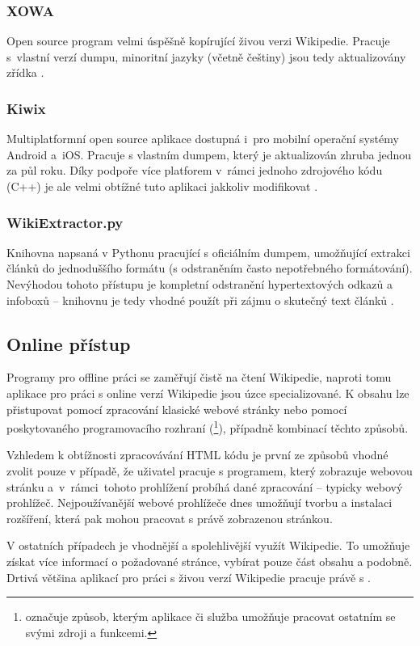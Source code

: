 \subsubsection{XOWA}
Open source program velmi úspěšně kopírující živou verzi Wikipedie. Pracuje s~vlastní verzí dumpu, minoritní jazyky (včetně češtiny) jsou tedy aktualizovány zřídka \cite{xowa}.
\subsubsection{Kiwix}
Multiplatformní open source aplikace dostupná i~pro mobilní operační systémy Android a~iOS. Pracuje s vlastním dumpem, který je aktualizován zhruba jednou za půl roku. Díky podpoře více platforem v~rámci jednoho zdrojového kódu (C++) je ale velmi obtížné tuto aplikaci jakkoliv modifikovat \cite{kiwix}.
\subsubsection{WikiExtractor.py}
Knihovna napsaná v Pythonu pracující s oficiálním dumpem, umožňující extrakci článků do jednoduššího formátu (s odstraněním často nepotřebného formátování). Nevýhodou tohoto přístupu je kompletní odstranění hypertextových odkazů a infoboxů -- knihovnu je tedy vhodné použít při zájmu o skutečný text článků \cite{wikiextractor}.

\subsection{Online přístup}
Programy pro offline práci se zaměřují čistě na čtení Wikipedie, naproti tomu aplikace pro práci s online verzí Wikipedie jsou úzce specializované. K obsahu lze přistupovat pomocí zpracování klasické webové stránky nebo pomocí poskytovaného programovacího rozhraní (\footnote{ označuje způsob, kterým aplikace či služba umožňuje pracovat ostatním se svými zdroji a funkcemi.}), případně kombinací těchto způsobů.

Vzhledem k obtížnosti zpracovávání HTML kódu je první ze způsobů vhodné zvolit pouze v případě, že uživatel pracuje s programem, který zobrazuje webovou stránku a~v~rámci~tohoto prohlížení probíhá dané zpracování -- typicky webový prohlížeč. Nejpoužívanější webové prohlížeče dnes umožňují tvorbu a instalaci rozšíření, která pak mohou pracovat s právě zobrazenou stránkou.

V ostatních případech je vhodnější a spolehlivější využít  Wikipedie. To umožňuje získat více informací o požadované stránce, vybírat pouze část obsahu a podobně. Drtivá většina aplikací pro práci s živou verzí Wikipedie pracuje právě s .
